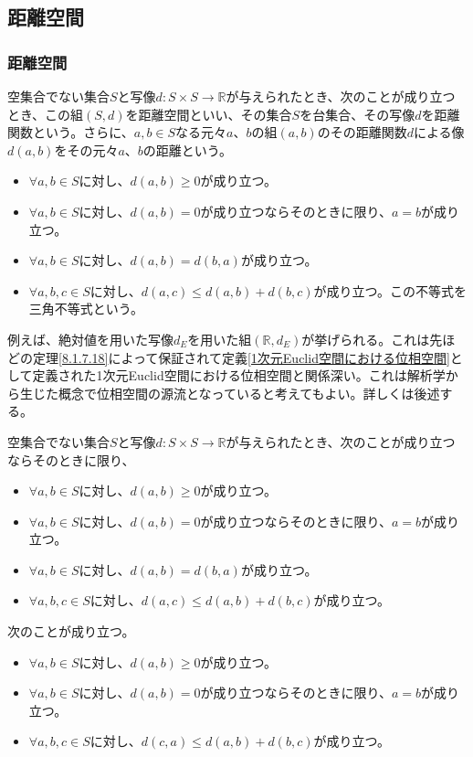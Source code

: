 \documentclass[dvipdfmx]{jsarticle}
\begin{document}
\subsection{距離空間}%
\subsubsection{距離空間}%
\begin{dfn}
空集合でない集合$S$と写像$d:S \times S \rightarrow \mathbb{R}$が与えられたとき、次のことが成り立つとき、この組$(S,d)$を距離空間といい、その集合$S$を台集合、その写像$d$を距離関数という。さらに、$a,b \in S$なる元々$a$、$b$の組$(a,b)$のその距離関数$d$による像$d(a,b)$をその元々$a$、$b$の距離という。
\begin{itemize}
\item
  $\forall a,b \in S$に対し、$d(a,b) \geq 0$が成り立つ。
\item
  $\forall a,b \in S$に対し、$d(a,b) = 0$が成り立つならそのときに限り、$a = b$が成り立つ。
\item
  $\forall a,b \in S$に対し、$d(a,b) = d(b,a)$が成り立つ。
\item
  $\forall a,b,c \in S$に対し、$d(a,c) \leq d(a,b) + d(b,c)$が成り立つ。この不等式を三角不等式という。
\end{itemize}
\end{dfn}\par
例えば、絶対値を用いた写像$d_{E}$を用いた組$\left( \mathbb{R},d_{E} \right)$が挙げられる。これは先ほどの定理\ref{8.1.7.18}によって保証されて定義\ref{1次元Euclid空間における位相空間}として定義された1次元Euclid空間における位相空間と関係深い。これは解析学から生じた概念で位相空間の源流となっていると考えてもよい。詳しくは後述する。
\begin{thm}\label{8.2.1.1}
空集合でない集合$S$と写像$d:S \times S \rightarrow \mathbb{R}$が与えられたとき、次のことが成り立つならそのときに限り、
\begin{itemize}
\item
  $\forall a,b \in S$に対し、$d(a,b) \geq 0$が成り立つ。
\item
  $\forall a,b \in S$に対し、$d(a,b) = 0$が成り立つならそのときに限り、$a = b$が成り立つ。
\item
  $\forall a,b \in S$に対し、$d(a,b) = d(b,a)$が成り立つ。
\item
  $\forall a,b,c \in S$に対し、$d(a,c) \leq d(a,b) + d(b,c)$が成り立つ。
\end{itemize}
次のことが成り立つ。
\begin{itemize}
\item
  $\forall a,b \in S$に対し、$d(a,b) \geq 0$が成り立つ。
\item
  $\forall a,b \in S$に対し、$d(a,b) = 0$が成り立つならそのときに限り、$a = b$が成り立つ。
\item
  $\forall a,b,c \in S$に対し、$d(c,a) \leq d(a,b) + d(b,c)$が成り立つ。
\end{itemize}
\end{thm}
\end{document}
